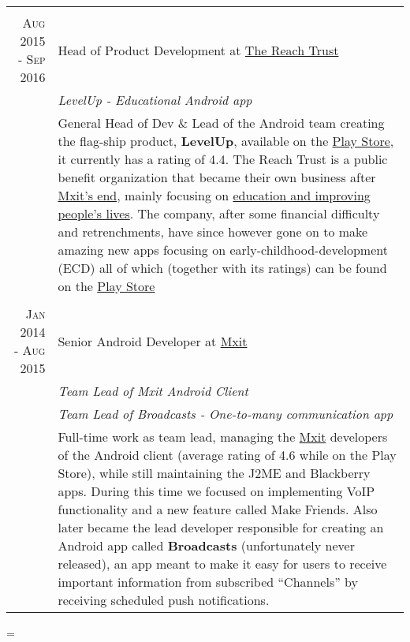 \documentclass[a4paper,10pt,notitlepage]{article}
\newenvironment{absolutelynopagebreak}
  {\par\nobreak\vfil\penalty0\vfilneg
   \vtop\bgroup}
  {\par\xdef\tpd{\the\prevdepth}\egroup
   \prevdepth=\tpd}
\begin{document}
\begin{absolutelynopagebreak}
\begin{tabular}{r|p{11cm}}
		\multicolumn{2}{c}{} \\
		\textsc{Aug 2015 - Sep 2016} & Head of Product Development at \href{www.thereachtrust.org}{The Reach Trust} \\                                                                  &\emph{LevelUp -  Educational Android app} \\
		                            &\footnotesize{General Head of Dev \& Lead of the Android team creating the  flag-ship product, \textbf{LevelUp}, available on the \href{https://play.google.com/store/apps/details?id=org.mylevelup}{Play Store}, it currently has a rating of 4.4. The Reach Trust is a public benefit organization that became their own business after \href{https://memeburn.com/2015/10/mxit-confirms-its-shutting-up-shop/}{Mxit's end}, mainly focusing on \href{https://it-online.co.za/2015/10/26/reach-trust-will-use-mxit-for-education/}{education and improving people's lives}. The company, after some financial difficulty and retrenchments, have since however gone on to make amazing new apps focusing on early-childhood-development (ECD) all of which (together with its ratings) can be found on the \href{https://play.google.com/store/apps/dev?id=7356513661681471434}{Play Store}} \\
		 
		\multicolumn{2}{c}{} \\
		\textsc{Jan 2014 - Aug 2015} & Senior Android Developer at \href{www.mxit.com}{Mxit} \\
		                             & \emph{Team Lead of Mxit Android Client} \\
		                             & \emph{Team Lead of Broadcasts - One-to-many communication app} \\
		                             & \footnotesize{Full-time work as team lead, managing the \href{https://en.wikipedia.org/wiki/Mxit}{Mxit} developers of the Android client (average rating of 4.6 while on the Play Store), while still maintaining the J2ME and Blackberry apps. During this time we focused on implementing VoIP functionality and a new feature called Make Friends. Also later became the lead developer responsible for creating an Android app called \textbf{Broadcasts} (unfortunately never released), an app meant to make it easy for users to receive important information from subscribed ``Channels'' by receiving scheduled push notifications. } \\
		 

\end{tabular}
\end{absolutelynopagebreak}
\end{document}
